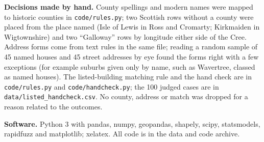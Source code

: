 \documentclass[11pt,a4paper]{article}
\begin{document}
\textbf{Decisions made by hand.} County spellings and modern names were mapped to historic counties in \texttt{code/rules.py}; two Scottish rows without a county were placed from the place named (Isle of Lewis in Ross and Cromarty; Kirkmaiden in Wigtownshire) and two ``Galloway'' rows by longitude either side of the Cree. Address forms come from text rules in the same file; reading a random sample of 45 named houses and 45 street addresses by eye found the forms right with a few exceptions (for example suburbs given only by name, such as Wavertree, classed as named houses). The listed-building matching rule and the hand check are in \texttt{code/rules.py} and \texttt{code/handcheck.py}; the 100 judged cases are in \texttt{data/listed\_handcheck.csv}. No county, address or match was dropped for a reason related to the outcomes.

\textbf{Software.} Python 3 with pandas, numpy, geopandas, shapely, scipy, statsmodels, rapidfuzz and matplotlib; xelatex. All code is in the data and code archive.
\end{document}
